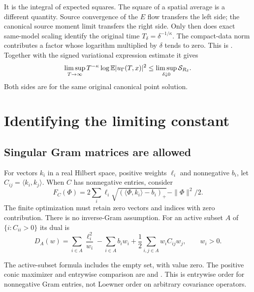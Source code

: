 
It is the integral of expected squares. The square of a spatial average is a
different quantity. Source convergence of the $E$ flow transfers the left side;
the canonical source moment limit transfers the right side. Only then does exact
same-model scaling identify the original time $T_\delta = \delta^{-1/\kappa}$.
The compact-data norm contributes a factor whose logarithm multiplied by
$\delta$ tends to zero. This is .
Together with the signed variational expression estimate it gives
\begin{equation}\label{E:reader-point-upper}
  \limsup_{T\to\infty}T^{-\kappa}\log\mathbb E|u_\Gamma(T,x)|^2
  \le\limsup_{\delta\downarrow0}\mathcal{S}_{R_\delta}.
\end{equation}
Both sides are for the same original canonical point solution.

\section{Identifying the limiting constant}
\label{S:reader-gram}
\subsection{Singular Gram matrices are allowed}

For vectors $k_i$ in a real Hilbert space, positive weights $\ell_i$ and
nonnegative $b_i$, let $C_{ij} = \langle k_i,k_j\rangle$. When $C$ has
nonnegative entries, consider
\begin{equation}\label{E:reader-gram}
  F_C(\Phi)=2\sum_i\ell_i
  \sqrt{(\langle\Phi,k_i\rangle-b_i)_+}
  -\|\Phi\|^2/2.
\end{equation}
The finite optimization must retain zero vectors and indices with zero
contribution. There is no inverse-Gram assumption. For an active subset $A$ of
$\{i:C_{ii}>0\}$ its dual is
\begin{equation}\label{E:reader-dual}
  D_A(w)=\sum_{i\in A}\frac{\ell_i^2}{w_i}
  -\sum_{i\in A}b_iw_i
  +\frac12\sum_{i,j\in A}w_iC_{ij}w_j,
  \qquad w_i>0.
\end{equation}



The active-subset formula includes the empty set, with value zero. The positive
conic maximizer and entrywise comparison are
 and
. This is entrywise order for nonnegative Gram
entries, not Loewner order on arbitrary covariance operators.

